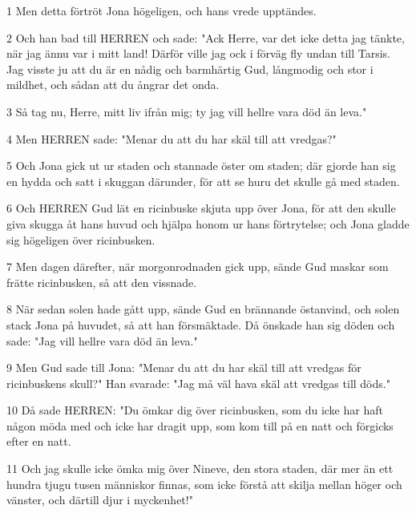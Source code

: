 \par 1 Men detta förtröt Jona högeligen, och hans vrede upptändes.
\par 2 Och han bad till HERREN och sade: "Ack Herre, var det icke detta jag tänkte, när jag ännu var i mitt land! Därför ville jag ock i förväg fly undan till Tarsis. Jag visste ju att du är en nådig och barmhärtig Gud, långmodig och stor i mildhet, och sådan att du ångrar det onda.
\par 3 Så tag nu, Herre, mitt liv ifrån mig; ty jag vill hellre vara död än leva."
\par 4 Men HERREN sade: "Menar du att du har skäl till att vredgas?"
\par 5 Och Jona gick ut ur staden och stannade öster om staden; där gjorde han sig en hydda och satt i skuggan därunder, för att se huru det skulle gå med staden.
\par 6 Och HERREN Gud lät en ricinbuske skjuta upp över Jona, för att den skulle giva skugga åt hans huvud och hjälpa honom ur hans förtrytelse; och Jona gladde sig högeligen över ricinbusken.
\par 7 Men dagen därefter, när morgonrodnaden gick upp, sände Gud maskar som frätte ricinbusken, så att den vissnade.
\par 8 När sedan solen hade gått upp, sände Gud en brännande östanvind, och solen stack Jona på huvudet, så att han försmäktade. Då önskade han sig döden och sade: "Jag vill hellre vara död än leva."
\par 9 Men Gud sade till Jona: "Menar du att du har skäl till att vredgas för ricinbuskens skull?" Han svarade: "Jag må väl hava skäl att vredgas till döds."
\par 10 Då sade HERREN: "Du ömkar dig över ricinbusken, som du icke har haft någon möda med och icke har dragit upp, som kom till på en natt och förgicks efter en natt.
\par 11 Och jag skulle icke ömka mig över Nineve, den stora staden, där mer än ett hundra tjugu tusen människor finnas, som icke förstå att skilja mellan höger och vänster, och därtill djur i myckenhet!"


